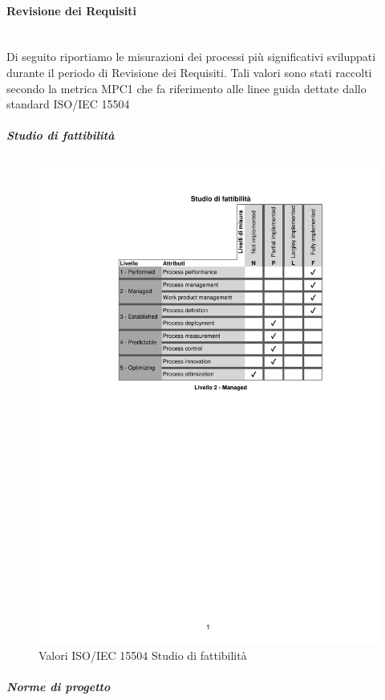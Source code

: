 \paragraph{Revisione dei Requisiti}\noindent \\
Di seguito riportiamo le misurazioni dei processi più significativi sviluppati durante il periodo di Revisione dei Requisiti. Tali valori sono stati raccolti secondo la metrica MPC1 che fa riferimento alle linee guida dettate dallo standard ISO/IEC 15504
\subparagraph{Studio di fattibilità}
\noindent
\begin{figure}[H]
	\centering
	\includegraphics[scale=1]{images/resoconto/RR/studiodifattibilita-RR.pdf}
	\caption{Valori ISO/IEC 15504 Studio di fattibilità}	
\end{figure}
\newpage
\subparagraph{Norme di progetto}
\noindent
